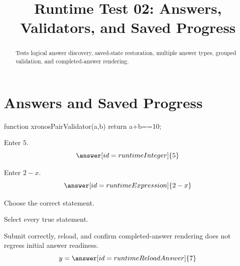 \documentclass{ximera}
\title{Runtime Test 02: Answers, Validators, and Saved Progress}
\begin{document}
\begin{abstract}
Tests logical answer discovery, saved-state restoration, multiple answer types,
grouped validation, and completed-answer rendering.
\end{abstract}
\maketitle

\section{Answers and Saved Progress}


\begin{javascript}
function xronosPairValidator(a,b) {
  return a+b==10;
}
\end{javascript}

\begin{problem}
Enter \(5\).
\[
\answer[id=runtimeInteger]{5}
\]
\end{problem}

\begin{problem}
Enter \(2-x\).
\[
\answer[id=runtimeExpression]{2-x}
\]
\end{problem}

\begin{problem}
Choose the correct statement.
\begin{multipleChoice}
\end{multipleChoice}
\end{problem}

\begin{problem}
Select every true statement.
\begin{selectAll}
\end{selectAll}
\end{problem}


\begin{problem}
Submit correctly, reload, and confirm completed-answer rendering does not
regress initial answer readiness.
\[
y=\answer[id=runtimeReloadAnswer]{7}
\]
\end{problem}
\end{document}

